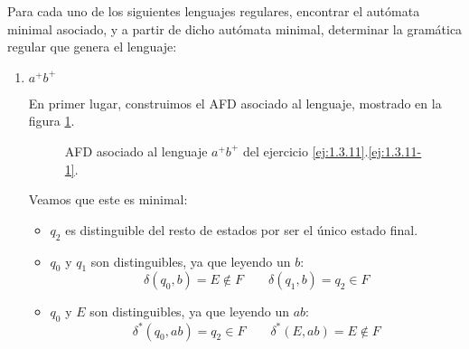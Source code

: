 \begin{ejercicio}\label{ej:1.3.11}
    Para cada uno de los siguientes lenguajes regulares, encontrar el autómata minimal asociado, y a partir de dicho autómata minimal, determinar la gramática regular que genera el lenguaje:
    \begin{enumerate}
        \item \label{ej:1.3.11-1}
        $a^+ b^+$
        
        En primer lugar, construimos el AFD asociado al lenguaje, mostrado en la figura \ref{fig:1.3.11-1-AFD}.
        \begin{figure}[H]
            \centering
            \caption{AFD asociado al lenguaje $a^+b^+$ del ejercicio \ref{ej:1.3.11}.\ref{ej:1.3.11-1}.}
            \label{fig:1.3.11-1-AFD}
        \end{figure}

        Veamos que este es minimal:
        \begin{itemize}
            \item $q_2$ es distinguible del resto de estados por ser el único estado final.
            \item $q_0$ y $q_1$ son distinguibles, ya que leyendo un $b$:
            \begin{equation*}
                \delta(q_0,b)=E\notin F\qquad \delta(q_1,b)=q_2\in F
            \end{equation*}

            \item $q_0$ y $E$ son distinguibles, ya que leyendo un $ab$:
            \begin{equation*}
                \delta^*(q_0,ab)=q_2\in F\qquad \delta^*(E,ab)=E\notin F
            \end{equation*}


\end{itemize}
\end{enumerate}
\end{ejercicio}
